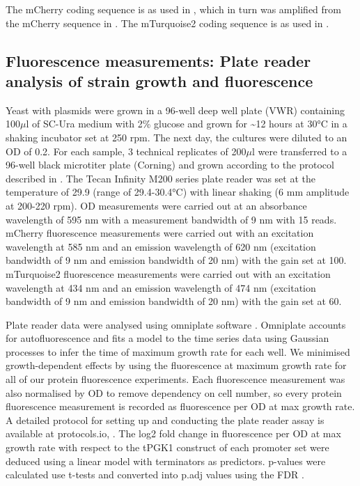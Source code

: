 \documentclass[../main.tex]{subfiles}
\begin{document}
The mCherry coding sequence is as used in \parencite{Garcia2018}, which in turn was amplified from the mCherry sequence in \parencite{Sharon2012}.
The mTurquoise2 coding sequence is as used in \parencite{Lee2015}.


\subsection{Fluorescence measurements: Plate reader analysis of strain growth and fluorescence}

Yeast with plasmids were grown in a 96-well deep well plate (VWR) containing 100\(\mu\)l of SC-Ura medium with 2\% glucose and grown for \textasciitilde12 hours at 30°C in a shaking incubator set at 250 rpm.
The next day, the cultures were diluted to an OD of 0.2. For each sample, 3 technical replicates of 200\(\mu\)l were transferred to a 96-well black microtiter plate (Corning) and grown according to the protocol described in \parencite{Lichten2014}.
The Tecan Infinity M200 series plate reader was set at the temperature of 29.9 (range of 29.4-30.4°C) with linear shaking (6 mm amplitude at 200-220 rpm).
OD measurements were carried out at an absorbance wavelength of 595 nm with a measurement bandwidth of 9 nm with 15 reads. mCherry fluorescence measurements were carried out with an excitation wavelength at 585 nm and an emission wavelength of 620 nm (excitation bandwidth of 9 nm and emission bandwidth of 20 nm) with the gain set at 100.
mTurquoise2 fluorescence measurements were carried out with an excitation wavelength at 434 nm and an emission wavelength of 474 nm (excitation bandwidth of 9 nm and emission bandwidth of 20 nm) with the gain set at 60.

Plate reader data were analysed using omniplate software \parencite{Swain2016}.
Omniplate accounts for autofluorescence and fits a model to the time series data using Gaussian processes to infer the time of maximum growth rate for each well.
We minimised growth-dependent effects by using the fluorescence at maximum growth rate for all of our protein fluorescence experiments.
Each fluorescence measurement was also normalised by OD to remove dependency on cell number, so every protein fluorescence measurement is recorded as fluorescence per OD at max growth rate.
A detailed protocol for setting up and conducting the plate reader assay is available at protocols.io, .
The log2 fold change in fluorescence per OD at max growth rate with respect to the tPGK1 construct of each promoter set were deduced using a linear model with terminators as predictors. 
p-values were calculated use t-tests and converted into p.adj values using the FDR \parencite{Benjamini1995}.
\end{document}
